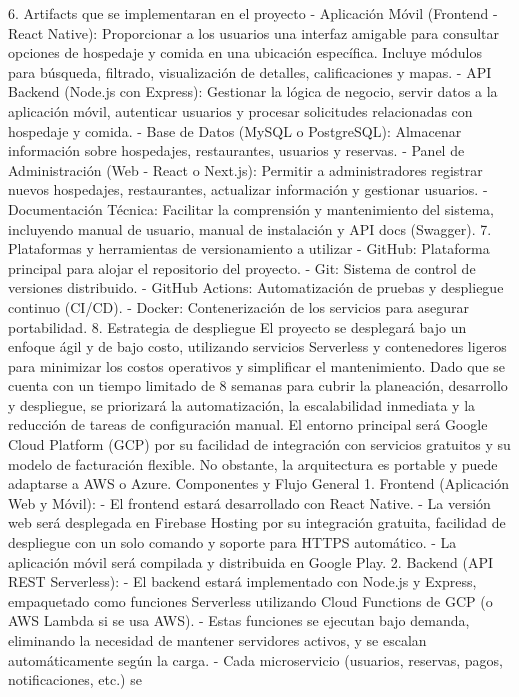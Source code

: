 6. Artifacts que se implementaran en el proyecto
- Aplicación Móvil (Frontend - React Native): Proporcionar a los usuarios
una interfaz
amigable para consultar opciones de hospedaje y comida en una
ubicación específica.
Incluye módulos para búsqueda, filtrado, visualización de detalles,
calificaciones y
mapas.
- API Backend (Node.js con Express): Gestionar la lógica de negocio, servir
datos a la
aplicación móvil, autenticar usuarios y procesar solicitudes relacionadas
con hospedaje
y comida.
- Base de Datos (MySQL o PostgreSQL): Almacenar información sobre
hospedajes,
restaurantes, usuarios y reservas.
- Panel de Administración (Web - React o Next.js): Permitir a
administradores registrar
nuevos hospedajes, restaurantes, actualizar información y gestionar
usuarios.
- Documentación Técnica: Facilitar la comprensión y mantenimiento del
sistema,
incluyendo manual de usuario, manual de instalación y API docs
(Swagger).
7. Plataformas y herramientas de versionamiento a utilizar
- GitHub: Plataforma principal para alojar el repositorio del proyecto.
- Git: Sistema de control de versiones distribuido.
- GitHub Actions: Automatización de pruebas y despliegue continuo
(CI/CD).
- Docker: Contenerización de los servicios para asegurar portabilidad.
8. Estrategia de despliegue
El proyecto se desplegará bajo un enfoque ágil y de bajo costo, utilizando
servicios Serverless y contenedores ligeros para minimizar los costos
operativos y simplificar el mantenimiento.
Dado que se cuenta con un tiempo limitado de 8 semanas para cubrir la
planeación, desarrollo y despliegue, se priorizará la automatización, la
escalabilidad inmediata y la reducción de tareas de configuración manual.
El entorno principal será Google Cloud Platform (GCP) por su facilidad de
integración con servicios gratuitos y su modelo de facturación flexible. No
obstante, la arquitectura es portable y puede adaptarse a AWS o Azure.
Componentes y Flujo General
1. Frontend (Aplicación Web y Móvil):
- El frontend estará desarrollado con React Native.
- La versión web será desplegada en Firebase Hosting por su
integración gratuita, facilidad de despliegue con un solo comando y
soporte para HTTPS automático.
- La aplicación móvil será compilada y distribuida en Google Play.
2. Backend (API REST Serverless):
- El backend estará implementado con Node.js y Express,
empaquetado como funciones Serverless utilizando Cloud Functions
de GCP (o AWS Lambda si se usa AWS).
- Estas funciones se ejecutan bajo demanda, eliminando la
necesidad de mantener servidores activos, y se escalan
automáticamente según la carga.
- Cada microservicio (usuarios, reservas, pagos, notificaciones, etc.) se
